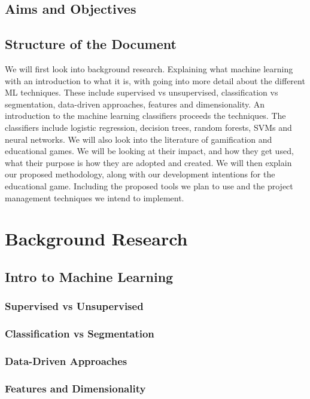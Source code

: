 \documentclass[a4paper,10pt]{article}
\begin{document}
\subsection{Aims and Objectives}

\subsection{Structure of the Document}
We will first look into background research. Explaining what machine learning with an introduction to what it is, with going into more detail about the different ML techniques. These include supervised vs unsupervised, classification vs segmentation, data-driven approaches, features and dimensionality. An introduction to the machine learning classifiers proceeds the techniques. The classifiers include logistic regression, decision trees, random forests, SVMs and neural networks. We will also look into the literature of gamification and educational games. We will be looking at their impact, and how they get used, what their purpose is how they are adopted and created. We will then explain our proposed methodology, along with our development intentions for the educational game. Including the proposed tools we plan to use and the project management techniques we intend to implement.

\section{Background Research}
\subsection{Intro to Machine Learning}
\subsubsection{Supervised vs Unsupervised}
\subsubsection{Classification vs Segmentation}
\subsubsection{Data-Driven Approaches}
\subsubsection{Features and Dimensionality}
\end{document}
